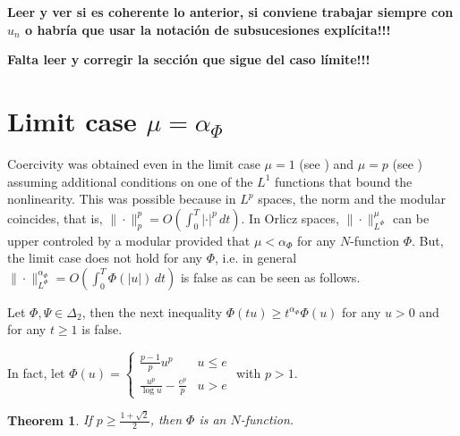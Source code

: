 \documentclass[twoside]{article}
\newtheorem{thm}{Theorem}[section]
\theoremstyle{remark}
\newcommand{\orlnor}{\|_{L^{\Phi}}}
\renewcommand{\leq}{\leqslant}
\begin{document}
{\bf Leer y ver si es coherente lo anterior,  si conviene trabajar siempre con $u_n$ o habr\'ia que usar la notaci\'on de subsucesiones expl\'icita!!!}

{\bf Falta leer y corregir la  secci\'on que sigue del caso l\'imite!!!}

\section{Limit case $\mu=\alpha_{\Phi}$}

Coercivity was obtained even in the limit case $\mu=1$ (see \cite{zhao2004periodic}) and 
  $\mu=p$ (see \cite{tang2010periodic}) assuming additional conditions on one of the $L^1$ 
functions that bound the nonlinearity.
This was possible because in $L^p$ spaces, the norm and the modular coincides, that is, $\|\cdot\|_p^p=O(\int_0^T |\cdot|^p\,dt)$.
In Orlicz spaces, $\|\cdot\orlnor^\mu$ can be upper controled by a modular provided that $\mu<\alpha_{\Phi}$ for any
$N$-function $\Phi$. But,  the limit case does  not hold for any $\Phi$, i.e. in general $\|\cdot\orlnor^{\alpha_{\Phi}}=O(\int_0^T \Phi(|u|)\,dt)$ is false as can be seen as follows.


Let $\Phi, \Psi \in \Delta_2$, then the next inequality $\Phi(tu)\geq t^{\alpha_{\Phi}}\Phi(u)$ for any $u>0$ and for any $t\geq 1$ is false.

In fact, let 
$\Phi(u)=
\left\{
\begin{array}{ll}
\frac{p-1}{p}u^p&u\leq e
\\
\frac{u^p}{\log u}-\frac{e^p}{p}&u>e
\end{array}
\right.$
with $p>1$.
\begin{thm}
If $p\geq \frac{1+\sqrt 2}{2}$, then $\Phi$ is an $N$-function.
\end{thm}
\end{document}
